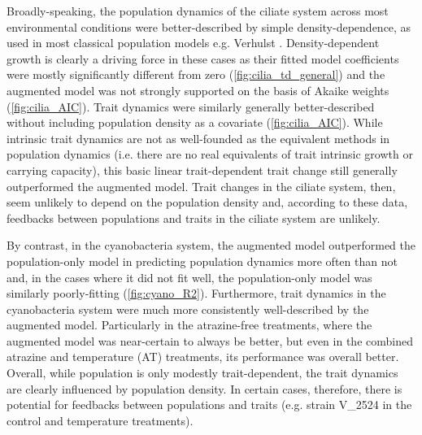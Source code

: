 \documentclass{article}
\begin{document}
Broadly-speaking, the population dynamics of the ciliate system across most environmental conditions were better-described by simple density-dependence, as used in most classical population models e.g. Verhulst \cite{Verhulst1838}. Density-dependent growth is clearly a driving force in these cases as their fitted model coefficients were mostly significantly different from zero (\cref{fig:cilia_td_general}) and the augmented model was not strongly supported on the basis of Akaike weights (\cref{fig:cilia_AIC}). Trait dynamics were similarly generally better-described without including population density as a covariate (\cref{fig:cilia_AIC}). While intrinsic trait dynamics are not as well-founded as the equivalent methods in population dynamics (i.e. there are no real equivalents of trait intrinsic growth or carrying capacity), this basic linear trait-dependent trait change still generally outperformed the augmented model. Trait changes in the ciliate system, then, seem unlikely to depend on the population density and, according to these data, feedbacks between populations and traits in the ciliate system are unlikely.

By contrast, in the cyanobacteria system, the augmented model outperformed the population-only model in predicting population dynamics more often than not and, in the cases where it did not fit well, the population-only model was similarly poorly-fitting (\cref{fig:cyano_R2}). Furthermore, trait dynamics in the cyanobacteria system were much more consistently well-described by the augmented model. Particularly in the atrazine-free treatments, where the augmented model was near-certain to always be better, but even in the combined atrazine and temperature (AT) treatments, its performance was overall better. Overall, while population is only modestly trait-dependent, the trait dynamics are clearly influenced by population density. In certain cases, therefore, there is potential for feedbacks between populations and traits (e.g. strain V\_2524 in the control and temperature treatments). 

\end{document}
